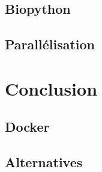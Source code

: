 \subsection{Biopython}
\subsection{Parallélisation}

\section{Conclusion}
\subsection{Docker}
\subsection{Alternatives}
































